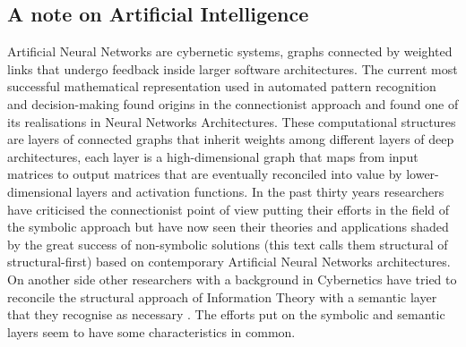 \documentclass[14pt]{extarticle}
\begin{document}
\subsection*{A note on Artificial Intelligence}
\label{sec:ai}

\hspace*{15mm}Artificial Neural Networks are cybernetic systems, graphs connected by weighted links that undergo feedback inside larger software architectures.
\newline
\hspace*{15mm}The current most successful mathematical representation used in automated pattern recognition and decision-making found origins in the connectionist approach \cite{PlatoConnectionism} and found one of its realisations in Neural Networks Architectures. These computational structures are layers of connected graphs that inherit weights among different layers of deep architectures, each layer is a high-dimensional graph that maps from input matrices to output matrices that are eventually reconciled into value by lower-dimensional layers and activation functions.
\newline
\hspace*{15mm}In the past thirty years researchers have criticised the connectionist point of view putting their efforts in the field of the symbolic approach \cite{WIKIsymbolic,SUNsymconn} but have now seen their theories and applications shaded by the great success of non-symbolic solutions (this text calls them structural of structural-first) based on contemporary Artificial Neural Networks architectures. On another side other researchers with a background in Cybernetics have tried to reconcile the structural approach of Information Theory with a semantic layer that they recognise as necessary \cite{leydesdorff2021evolutionary}. The efforts put on the symbolic and semantic layers seem to have some characteristics in common.
\newline
\end{document}
